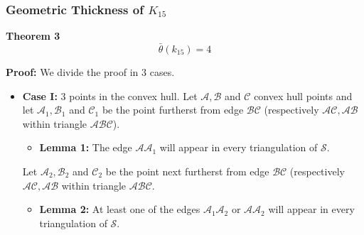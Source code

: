 \documentclass[12 pt]{beamer}
\begin{document}
\begin{frame}{}
    \frametitle{Geometric Thickness of $K_{15}$}
    
    \begin{block}{\textbf{Theorem 3}}
    $$\bar{\theta} (k_{15}) = 4 $$
    \end{block}
    
    \pause
    
    \textbf{Proof:}
    We divide the proof in $3$ cases.
    
    \begin{itemize}
    \item \textbf{Case I:} $3$ points in the convex hull. 
    Let $\mathcal{A, B}$ and $\mathcal{C}$ convex hull points and let $\mathcal{A}_{1}, \mathcal{B}_{1}$ and $\mathcal{C}_{1}$ be the point furtherst from edge $\mathcal{BC}$ (respectively $\mathcal{AC}, \mathcal{AB}$ within triangle $\mathcal{ABC}$).
        \begin{itemize}
            \item \textbf{Lemma 1:} The edge $\mathcal{AA}_{1}$ will appear in every triangulation of $\mathcal{S}$.
        \end{itemize}
    Let $\mathcal{A}_{2}, \mathcal{B}_{2}$ and $\mathcal{C}_{2}$ be the point next furtherst from edge $\mathcal{BC}$ (respectively $\mathcal{AC}, \mathcal{AB}$ within triangle $\mathcal{ABC}$.
        \begin{itemize}
            \item \textbf{Lemma 2:} At least one of the edges $\mathcal{A}_{1}\mathcal{A}_{2}$ or $\mathcal{A}\mathcal{A}_{2}$ will appear in every triangulation of $\mathcal{S}$.
        \end{itemize}
    \end{itemize}
\end{frame} 
\end{document}
